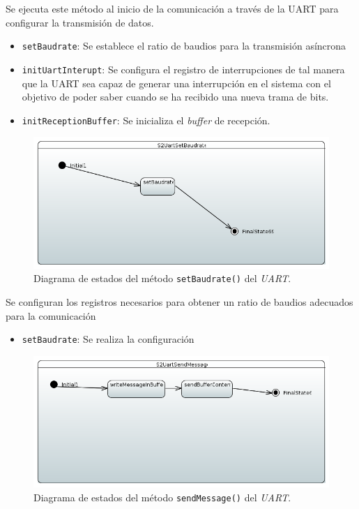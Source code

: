Se ejecuta este método al inicio de la comunicación a través de la UART para configurar la transmisión de datos.

\begin{itemize}
    \item \texttt{setBaudrate}: Se establece el ratio de baudios para la transmisión asíncrona
    \item \texttt{initUartInterupt}: Se configura el registro de interrupciones de tal manera que la UART sea capaz de generar una interrupción en el sistema con el objetivo de poder saber cuando se ha recibido una nueva trama de bits.
    \item \texttt{initReceptionBuffer}: Se inicializa el \textit{buffer} de recepción.
    
\end{itemize}

\begin{figure}[H]
    \centering
    \includegraphics[width=1\linewidth]{pictures/S2UartSetBaudrate.PNG}
    \caption{Diagrama de estados del método \texttt{setBaudrate()} del \textit{UART}.}
    \label{fig:fun_set_baudrate_uart}
\end{figure}

Se configuran los registros necesarios para obtener un ratio de baudios adecuados para la comunicación

\begin{itemize}
    \item \texttt{setBaudrate}: Se realiza la configuración 
\end{itemize}

\begin{figure}[H]
    \centering
    \includegraphics[width=1\linewidth]{pictures/S2UartSendMessage.PNG}
    \caption{Diagrama de estados del método \texttt{sendMessage()} del \textit{UART}.}
    \label{fig:fun_send_message_uart}
\end{figure}

